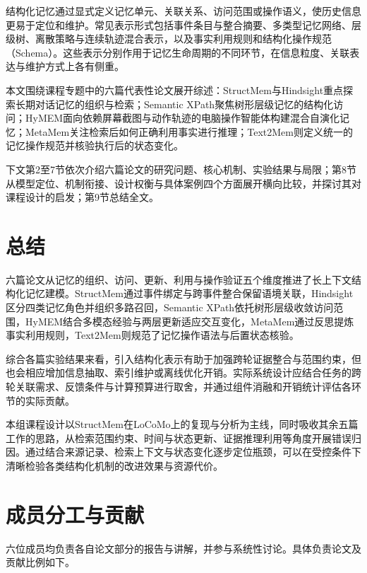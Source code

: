 \documentclass{jos}
\begin{document}
结构化记忆通过显式定义记忆单元、关联关系、访问范围或操作语义，使历史信息更易于定位和维护。常见表示形式包括事件条目与整合摘要、多类型记忆网络、层级树、离散策略与连续轨迹混合表示，以及事实利用规则和结构化操作规范（Schema）。这些表示分别作用于记忆生命周期的不同环节，在信息粒度、关联表达与维护方式上各有侧重。

本文围绕课程专题中的六篇代表性论文展开综述：StructMem与Hindsight重点探索长期对话记忆的组织与检索；Semantic XPath聚焦树形层级记忆的结构化访问；HyMEM面向依赖屏幕截图与动作轨迹的电脑操作智能体构建混合自演化记忆；MetaMem关注检索后如何正确利用事实进行推理；Text2Mem则定义统一的记忆操作规范并核验执行后的状态变化。

下文第2至7节依次介绍六篇论文的研究问题、核心机制、实验结果与局限；第8节从模型定位、机制衔接、设计权衡与具体案例四个方面展开横向比较，并探讨其对课程设计的启发；第9节总结全文。










\section{总结}
六篇论文从记忆的组织、访问、更新、利用与操作验证五个维度推进了长上下文结构化记忆建模。StructMem通过事件绑定与跨事件整合保留语境关联，Hindsight区分四类记忆角色并组织多路召回，Semantic XPath依托树形层级收敛访问范围，HyMEM结合多模态经验与两层更新适应交互变化，MetaMem通过反思提炼事实利用规则，Text2Mem则规范了记忆操作语法与后置状态核验。

综合各篇实验结果来看，引入结构化表示有助于加强跨轮证据整合与范围约束，但也会相应增加信息抽取、索引维护或离线优化开销。实际系统设计应结合任务的跨轮关联需求、反馈条件与计算预算进行取舍，并通过组件消融和开销统计评估各环节的实际贡献。

本组课程设计以StructMem在LoCoMo上的复现与分析为主线，同时吸收其余五篇工作的思路，从检索范围约束、时间与状态更新、证据推理利用等角度开展错误归因。通过结合来源记录、检索上下文与状态变化逐步定位瓶颈，可以在受控条件下清晰检验各类结构化机制的改进效果与资源代价。




\section*{成员分工与贡献}
六位成员均负责各自论文部分的报告与讲解，并参与系统性讨论。具体负责论文及贡献比例如下。
\end{document}
